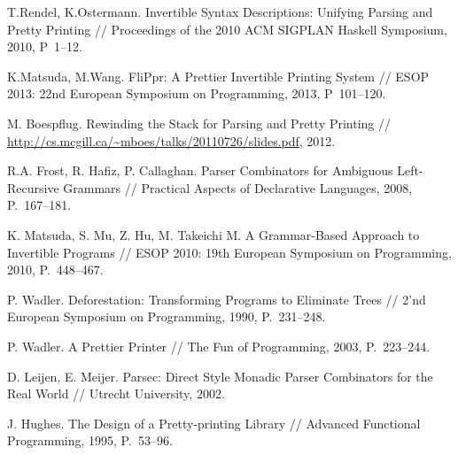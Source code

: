 \begin{thebibliography}{99}
  T.Rendel, K.Ostermann. Invertible Syntax Descriptions: Unifying Parsing and Pretty Printing //
  Proceedings of the 2010 ACM SIGPLAN Haskell Symposium, 2010, P~1--12.

  K.Matsuda, M.Wang. FliPpr: A Prettier Invertible Printing System //
  ESOP 2013: 22nd European Symposium on Programming, 2013, P~101--120.

  M. Boespflug. Rewinding the Stack for Parsing and Pretty Printing // 
  \url{http://cs.mcgill.ca/~mboes/talks/20110726/slides.pdf}, 2012.

  R.A. Frost, R. Hafiz, P. Callaghan.
  Parser Combinators for Ambiguous Left-Recursive Grammars // 
  Practical Aspects of Declarative Languages, 2008, P.~167--181.

  K. Matsuda, S. Mu, Z. Hu, M. Takeichi M.
  A Grammar-Based Approach to Invertible Programs //
  ESOP 2010: 19th European Symposium on Programming, 2010, P.~448--467.

  P. Wadler. Deforestation: Transforming Programs to Eliminate Trees //
  2'nd European Symposium on Programming, 1990, P.~231--248.

  P. Wadler. A Prettier Printer // The Fun of Programming, 2003, P.~223--244.

  D. Leijen, E. Meijer.
  Parsec: Direct Style Monadic Parser Combinators for the Real World //
  Utrecht University, 2002.

  J. Hughes. The Design of a Pretty-printing Library // Advanced Functional Programming,
  1995, P.~53--96.

\end{thebibliography}
